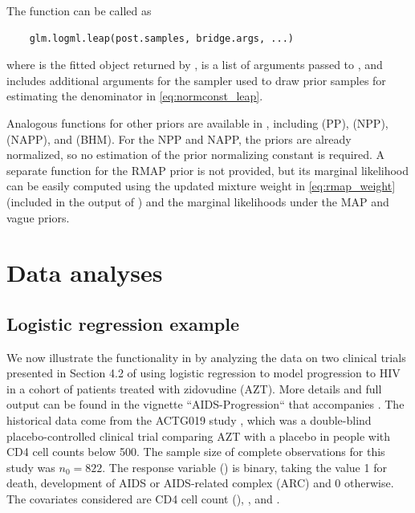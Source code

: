 The function can be called as
\begin{verbatim}
    glm.logml.leap(post.samples, bridge.args, ...)
\end{verbatim}
where  is the fitted object returned by ,  is a list of arguments passed to , and  includes additional arguments for the  sampler used to draw prior samples for estimating the denominator in \eqref{eq:normconst_leap}. 

Analogous functions for other priors are available in , including  (PP),  (NPP),  (NAPP), and  (BHM). For the NPP and NAPP, the priors are already normalized, so no estimation of the prior normalizing constant is required. A separate function for the RMAP prior is not provided, but its marginal likelihood can be easily computed using the updated mixture weight in \eqref{eq:rmap_weight} (included in the output of ) and the marginal likelihoods under the MAP and vague priors. 

\section{Data analyses}
\label{sec:dataanalysis}
\subsection{Logistic regression example}
\label{sec:dataanalysis_logistic}

We now illustrate the functionality in  by analyzing the data on two clinical trials presented in Section 4.2 of \citet{chen1999prior} using logistic regression to model progression to HIV in a cohort of patients treated with zidovudine (AZT). 
More details and full output can be found in the vignette ``AIDS-Progression`` that accompanies . The historical data come from the ACTG019 study \citep{Volberding1990}, which
was a double-blind placebo-controlled clinical trial comparing AZT with a placebo in people with CD4 cell counts below 500.
The sample size of complete observations for this study was $n_0 = 822$.
The response variable () is binary, taking the value 1 for death,
development of AIDS or AIDS-related complex (ARC) and 0 otherwise.
The covariates considered are CD4 cell count (), ,  and
.


